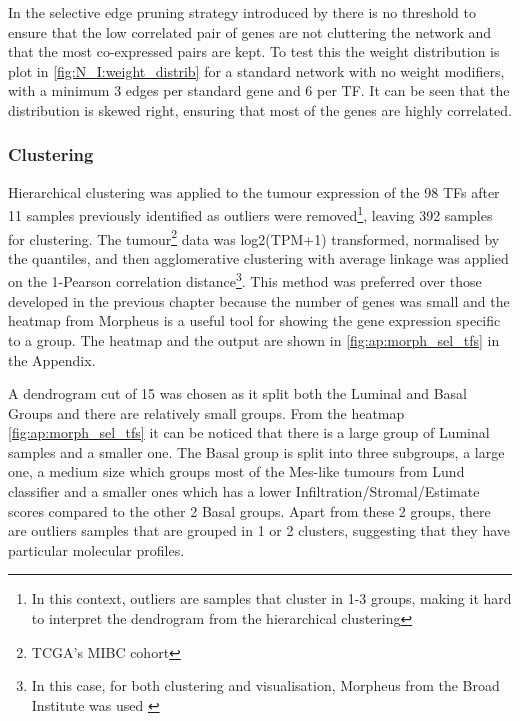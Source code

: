 In the selective edge pruning strategy introduced by \citet{Care2019-ij} there is no threshold to ensure that the low correlated pair of genes are not cluttering the network and that the most co-expressed pairs are kept. To test this the weight distribution is plot in \cref{fig:N_I:weight_distrib} for a standard network with no weight modifiers, with a minimum 3 edges per standard gene and 6 per TF. It can be seen that the distribution is skewed right, ensuring that most of the genes are highly correlated.

\subsubsection*{Clustering}


Hierarchical clustering was applied to the tumour expression of the 98 TFs after 11 samples previously identified as outliers were removed\footnote{In this context, outliers are samples that cluster in 1-3 groups, making it hard to interpret the dendrogram from the hierarchical clustering}, leaving 392 samples for clustering. The tumour\footnote{TCGA's MIBC cohort} data was log2(TPM+1) transformed, normalised by the quantiles, and then agglomerative clustering with average linkage was applied on the 1-Pearson correlation distance\footnote{In this case, for both clustering and visualisation, Morpheus from the Broad Institute was used \cite{Broad-InstituteUnknown-kn}}. This method was preferred over those developed in the previous chapter because the number of genes was small and the heatmap from Morpheus is a useful tool for showing the gene expression specific to a group. The heatmap and the output are shown in \cref{fig:ap:morph_sel_tfs} in the Appendix.

A dendrogram cut of 15 was chosen as it split both the Luminal and Basal Groups and there are relatively small groups. From the heatmap \cref{fig:ap:morph_sel_tfs} it can be noticed that there is a large group of Luminal samples and a smaller one. The Basal group is split into three subgroups, a large one, a medium size which groups most of the Mes-like tumours from Lund classifier and a smaller ones which has a lower Infiltration/Stromal/Estimate scores compared to the other 2 Basal groups. Apart from these 2 groups, there are outliers samples that are grouped in 1 or 2 clusters, suggesting that they have particular molecular profiles.

